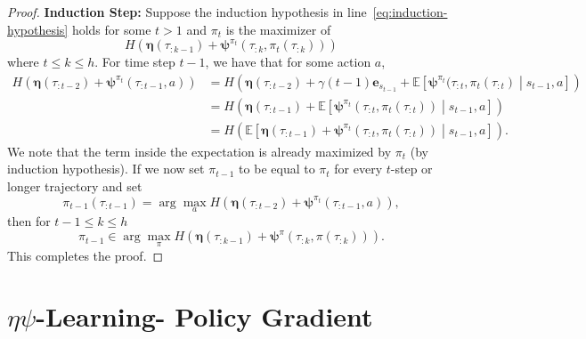 \documentclass{article}
\theoremstyle{plain}
\theoremstyle{definition}
\theoremstyle{remark}
\newcommand{\alg}{$\eta$$\psi$-Learning}
\begin{document}
\begin{proof}
    \textbf{Induction Step:}
    Suppose the induction hypothesis in line~\eqref{eq:induction-hypothesis} holds for some $t > 1$ and $\pi_t$ is the maximizer of 
    \begin{equation}
        H( \pmb{\eta}(\tau_{:{k-1}}) + \pmb{\psi}^{\pi_t}(\tau_{:k},\pi_t( \tau_{:k} )) ) 
    \end{equation}
    where $t \le k \le h$.
    For time step $t-1$, we have that for some action $a$,
    \begin{align}
        H( \pmb{\eta}(\tau_{:t-2}) + \pmb{\psi}^{\pi_{t}}(\tau_{:t-1}, a) ) 
        &= H( \pmb{\eta}(\tau_{:t-2}) + \gamma(t-1) \pmb{e}_{s_{t-1}} + \mathbb{E} \left[ \pmb{\psi}^{\pi_{t}}(\tau_{:t}, \pi_t(\tau_{:t}) \middle| s_{t-1},a \right] ) \\
        &= H( \pmb{\eta}(\tau_{:t-1}) + \mathbb{E} \left[ \pmb{\psi}^{\pi_{t}}(\tau_{:t}, \pi_t(\tau_{:t})) \middle| s_{t-1},a \right] ) \\
        &= H( \mathbb{E} \left[ \pmb{\eta}(\tau_{:t-1}) + \pmb{\psi}^{\pi_{t}}(\tau_{:t}, \pi_t(\tau_{:t})) \middle| s_{t-1},a \right] ).
    \end{align}
    We note that the term inside the expectation is already maximized by $\pi_t$ (by induction hypothesis).
    If we now set $\pi_{t-1}$ to be equal to $\pi_t$ for every $t$-step or longer trajectory and set
    \begin{equation}
        \pi_{t-1}(\tau_{:t-1}) = \arg \max_a H( \pmb{\eta}(\tau_{:t-2}) + \pmb{\psi}^{\pi_{t}}(\tau_{:t-1}, a) ),
    \end{equation}
    then for $t - 1 \le k \le h$ 
    \begin{equation}
        \pi_{t-1} \in \arg \max_\pi H( \pmb{\eta}(\tau_{:{k-1}}) + \pmb{\psi}^{\pi}(\tau_{:k},\pi( \tau_{:k} )) ).
    \end{equation}
    This completes the proof.
\end{proof}


\section{\alg{}- Policy Gradient}
\label{app:policy_gradient}
\end{document}
